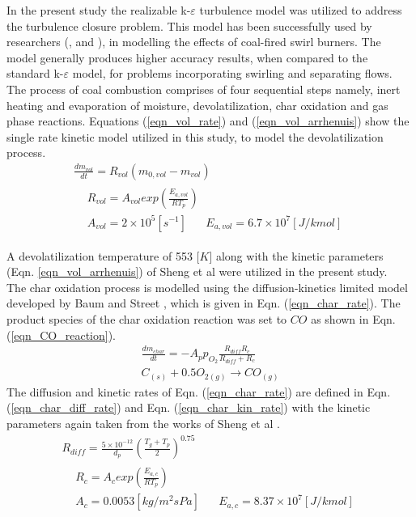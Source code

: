 \documentclass[twocolumn,10pt]{asme2ej}
\begin{document}
In the present study the realizable k-$\varepsilon$ turbulence model was utilized to address the turbulence closure problem. This model has been successfully used by researchers (\cite{Belosevic2019a},\cite{Laubscher2019a} and \cite{Modlinski2019}), in modelling the effects of coal-fired swirl burners. The model generally produces higher accuracy results, when compared to the standard k-$\varepsilon$ model, for problems incorporating swirling and separating flows.\\

The process of coal combustion comprises of four sequential steps namely, inert heating and evaporation of moisture, devolatilization, char oxidation and gas phase reactions. Equations (\ref{eqn_vol_rate}) and (\ref{eqn_vol_arrhenuis}) show the single rate kinetic model utilized in this study, to model the devolatilization process.
\begin{gather}
\frac{dm_{vol}}{dt} = R_{vol}(m_{0,vol}-m_{vol}) \label{eqn_vol_rate} \\
\begin{split}
&R_{vol} = A_{vol}exp\left(\frac{E_{a,vol}}{RT_p}\right)\\
&A_{vol} = 2\times10^5 [s^{-1}]\,\,\,\,\,\,\,\,\,\,E_{a,vol} = 6.7\times10^7 [J/kmol] \label{eqn_vol_arrhenuis}
\end{split}
\end{gather}

A devolatilization temperature of 553 [$K$] \cite{Ranade2015} along with the kinetic parameters (Eqn. \ref{eqn_vol_arrhenuis}) of Sheng et al \cite{Sheng2004} were utilized in the present study.\\
\newpage
The char oxidation process is modelled using the diffusion-kinetics limited model developed by Baum and Street \cite{Baum1971}, which is given in Eqn. (\ref{eqn_char_rate}). The product species of the char oxidation reaction was set to $CO$ as shown in Eqn. (\ref{eqn_CO_reaction}). 
\begin{gather}
\frac{dm_{char}}{dt} = -A_p p_{O_{2}} \frac{R_{diff}R_c}{R_{diff} + R_c}  \label{eqn_char_rate}\\
C_{(s)}+0.5O_{2(g)}\to CO_{(g)} \label{eqn_CO_reaction}
\end{gather}
The diffusion and kinetic rates of Eqn. (\ref{eqn_char_rate}) are defined in Eqn. (\ref{eqn_char_diff_rate})  and Eqn. (\ref{eqn_char_kin_rate}) with the kinetic parameters again taken from the works of Sheng et al \cite{Sheng2004}.
\begin{gather}
R_{diff} = \frac{5\times10^{-12}}{d_p} \left(\frac{T_g+T_p}{2}\right)^{0.75} \label{eqn_char_diff_rate}\\
\begin{split}
&R_{c} = A_{c}exp\left(\frac{E_{a,c}}{RT_p}\right)\\
&A_{c} = 0.0053 [kg/m^2sPa]\,\,\,\,\,\,\,\,\,\,E_{a,c} = 8.37\times10^7 [J/kmol]
\end{split}
 \label{eqn_char_kin_rate}
\end{gather}
\end{document}
